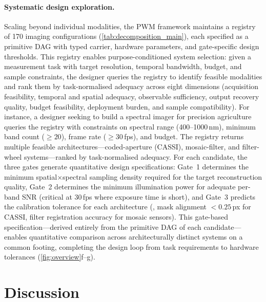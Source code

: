 \paragraph{Systematic design exploration.}
\begin{sloppypar}
Scaling beyond individual modalities, the PWM framework maintains a registry of 170 imaging configurations (\cref{tab:decomposition_main}), each specified as a primitive DAG with typed carrier, hardware parameters, and gate-specific design thresholds. This registry enables purpose-conditioned system selection: given a measurement task with target resolution, temporal bandwidth, budget, and sample constraints, the designer queries the registry to identify feasible modalities and rank them by task-normalised adequacy across eight dimensions (acquisition feasibility, temporal and spatial adequacy, observable sufficiency, output recovery quality, budget feasibility, deployment burden, and sample compatibility). For instance, a designer seeking to build a spectral imager for precision agriculture queries the registry with constraints on spectral range (400--1000\,nm), minimum band count ($\geq 20$), frame rate ($\geq 30$\,fps), and budget. The registry returns multiple feasible architectures---coded-aperture (CASSI), mosaic-filter, and filter-wheel systems---ranked by task-normalised adequacy. For each candidate, the three gates generate quantitative design specifications: Gate~1 determines the minimum spatial$\times$spectral sampling density required for the target reconstruction quality, Gate~2 determines the minimum illumination power for adequate per-band SNR (critical at 30\,fps where exposure time is short), and Gate~3 predicts the calibration tolerance for each architecture (\eg{}, mask alignment $< 0.25$\,px for CASSI, filter registration accuracy for mosaic sensors). This gate-based specification---derived entirely from the primitive DAG of each candidate---enables quantitative comparison across architecturally distinct systems on a common footing, completing the design loop from task requirements to hardware tolerances (\cref{fig:overview}f--g).
\end{sloppypar}


\FloatBarrier
\section*{Discussion}

